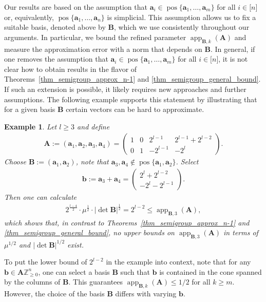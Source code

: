 \documentclass[pdflatex]{sn-jnl}
\DeclareMathOperator{\app}{app}
\DeclareMathOperator{\pos}{pos}
\newcommand{\Z}{\mathbb{Z}}
\newcommand{\bA}{\bm{A}}
\newcommand{\bb}{\bm{b}}
\newcommand{\ba}{\bm{a}}
\newcommand{\bB}{\bm{B}}
\theoremstyle{thmstyleone}%
\theoremstyle{thmstyletwo}%
\newtheorem{example}{Example}%
\theoremstyle{thmstylethree}%
\begin{document}
	Our results are based on the assumption that $\ba_i\in\pos\lbrace \ba_1,\ldots,\ba_m\rbrace$ for all $i\in\lbrack n\rbrack$ or, equivalently, $\pos\lbrace \ba_1,\ldots,\ba_n\rbrace$ is simplicial. This assumption allows us to fix a suitable basis, denoted above by $\bB$, which we use consistently throughout our arguments. In particular, we bound the refined parameter $\app_{\bB,k}(\bA)$ and measure the approximation error with a norm that depends on $\bB$. 
	In general, if one removes the assumption that $\ba_i\in\pos\lbrace \ba_1,\ldots,\ba_m\rbrace$ for all $i\in\lbrack n\rbrack$, it is not clear how to obtain results in the flavor of Theorems~\ref{thm_semigroup_approx_n-1} and \ref{thm_semigroup_general_bound}. If such an extension is possible, it likely requires new approaches and further assumptions. The following example supports this statement by illustrating that for a given basis $\bB$ certain vectors can be hard to approximate.
	
	\begin{example}
		Let $l\geq 3$ and define
		\begin{align*}
			\bA := (\ba_1,\ba_2,\ba_3,\ba_4) =
			\begin{pmatrix}
				1 & 0 & 2^{l-1} & 2^{l-1} + 2^{l-2}\\ 0 & 1 & -2^{l-1} & -2^l
			\end{pmatrix}.
		\end{align*}
		Choose $\bB := (\ba_1,\ba_2)$, note that $\ba_3,\ba_4\notin\pos\lbrace \ba_1,\ba_2\rbrace$. Select
		\begin{align*}
			\bb := \ba_3 + \ba_4 = \begin{pmatrix}
				2^l + 2^{l-2} \\ -2^l - 2^{l-1}
			\end{pmatrix}.
		\end{align*}
		Then one can calculate
		\begin{align*}
			2^{\frac{l - 4}{2}}\cdot\mu^{\frac{1}{2}}\cdot\left|\det\bB\right|^{\frac{1}{2}} = 2^{l-2} \leq \app_{\bB,3}(\bA),
		\end{align*}
		which shows that, in contrast to Theorems~\ref{thm_semigroup_approx_n-1} and \ref{thm_semigroup_general_bound}, no upper bounds on $\app_{\bB,3}(\bA)$ in terms of $\mu^{1/2}$ and $\left|\det\bB\right|^{1/2}$ exist.
	\end{example}
	To put the lower bound of $2^{l-2}$ in the example into context, note that for any $\bb \in\bA\Z^n_{\geq 0}$, one can select a basis $\bB$ such that $\bb$ is contained in the cone spanned by the columns of $\bB$. This guarantees $\app_{\bB,k}(\bA)\leq 1/2$ for all $k\geq m$. However, the choice of the basis $\bB$ differs with varying $\bb$.
	
\end{document}
